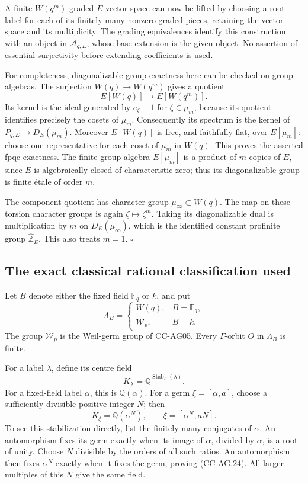 \documentclass[11pt,a4paper]{article}
\theoremstyle{definition}\newtheorem{definition}[theorem]{Definition}
\theoremstyle{remark}\newtheorem{remark}[theorem]{Remark}
\begin{document}
A finite \(W(q^m)\)-graded \(E\)-vector space can now be lifted by
choosing a root label for each of its finitely many nonzero
graded pieces, retaining the vector space and its multiplicity.
The grading equivalences identify this construction with an
object in \(\mathcal A_{q,E}\), whose base extension is the given
object.  No assertion of essential surjectivity before extending
coefficients is used.

For completeness, diagonalizable-group exactness here can be
checked on group algebras.  The surjection \(W(q)\to W(q^m)\)
gives a quotient
\[
       E[W(q)]\longrightarrow E[W(q^m)].
\]
Its kernel is the ideal generated by \(e_\zeta-1\) for
\(\zeta\in\mu_m\), because its quotient identifies precisely
the cosets of \(\mu_m\).  Consequently its spectrum is the
kernel of \(P_{q,E}\to D_E(\mu_m)\).  Moreover
\(E[W(q)]\) is free, and faithfully flat, over \(E[\mu_m]\):
choose one representative for each coset of \(\mu_m\) in
\(W(q)\).  This proves the asserted fpqc exactness.
The finite group algebra \(E[\mu_m]\) is a product of \(m\)
copies of \(E\), since \(E\) is algebraically closed of
characteristic zero; thus its diagonalizable group is finite
\'{e}tale of order \(m\).

The component quotient has character group
\(\mu_\infty\subset W(q)\).  The map on these torsion
character groups is again \(\zeta\mapsto\zeta^m\).
Taking its diagonalizable dual is multiplication by \(m\)
on \(D_E(\mu_\infty)\), which is the identified constant
profinite group \(\widehat{\mathbb Z}_E\).
This also treats \(m=1\). \(\square\)

\subsection{The exact classical rational classification used}

Let \(B\) denote either the fixed field \(\mathbb F_q\) or
\(\bar k\), and put
\[
 \Lambda_B=
 \begin{cases}
      W(q),&B=\mathbb F_q,\\
      \mathcal W_p,&B=\bar k.
 \end{cases}
\]
The group \(\mathcal W_p\) is the Weil-germ group of CC-AG05.
Every \(\Gamma\)-orbit \(O\) in \(\Lambda_B\) is finite.

For a label \(\lambda\), define its centre field
\[
        K_\lambda=
        \overline{\mathbb Q}^{\operatorname{Stab}_\Gamma(\lambda)}.
                                                               \tag{CC-AG.23}
\]
For a fixed-field label \(\alpha\), this is
\(\mathbb Q(\alpha)\).  For a germ
\(\xi=[\alpha,a]\), choose a sufficiently divisible positive
integer \(N\); then
\[
       K_\xi=\mathbb Q(\alpha^N), \qquad
       \xi=[\alpha^N,aN].                                    \tag{CC-AG.24}
\]
To see this stabilization directly, list the finitely many
conjugates of \(\alpha\).  An automorphism fixes its germ
exactly when its image of \(\alpha\), divided by \(\alpha\),
is a root of unity.  Choose \(N\) divisible by the orders of
all such ratios.  An automorphism then fixes \(\alpha^N\)
exactly when it fixes the germ, proving (CC-AG.24).
All larger multiples of this \(N\) give the same field.
\end{document}

